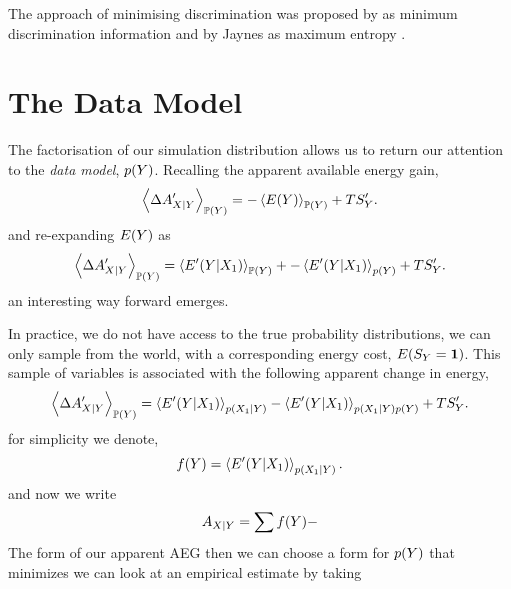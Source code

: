 \documentclass[]{article}
\begin{document}
The approach of minimising discrimination was proposed by \cite{Kullback-} as minimum discrimination information and by Jaynes as maximum entropy \cite{} .

\section{The Data Model}

The factorisation of our simulation distribution allows us to return our attention to the \emph{data model}, $p(Y)$. Recalling the apparent available energy gain, 
\[
\left\langle \Delta A^\prime_{X|Y} \right\rangle_{\mathbb{P}(Y)} = -\left\langle E(Y) \right\rangle_{\mathbb{P}(Y)} + TS^\prime_Y.
\] 
and re-expanding $E(Y)$ as 
\[
\left\langle \Delta A^\prime_{X|Y} \right\rangle_{\mathbb{P}(Y)} = \left\langle E^\prime(Y|X_1) \right\rangle_{\mathbb{P}(Y)} + -\left\langle E^\prime(Y|X_1) \right\rangle_{p(Y)}+ TS^\prime_Y.
\] 
an interesting way forward emerges. 

In practice, we do not have access to the true probability distributions, we can only sample from the world, with a corresponding energy cost, $E(S_Y=\textbf{1})$. This sample of variables is associated with the following apparent change in energy, 
\[
\left\langle \Delta A^\prime_{X|Y} \right\rangle_{\mathbb{P}(Y)} = \left\langle E^\prime(Y|X_1) \right\rangle_{p(X_1|Y)}  -\left\langle E^\prime(Y|X_1) \right\rangle_{p(X_1|Y)p(Y)}+ TS^\prime_Y.
\] 
for simplicity we denote,
\[
f(Y) = \left\langle E^\prime(Y|X_1) \right\rangle_{p(X_1|Y)}.
\]
and now we write
\[
A_{X|Y} = \sum f(Y) -
\]
The form of our apparent AEG  then we can choose a form for $p(Y)$ that minimizes 
we can look at an empirical estimate by taking 
\end{document}

